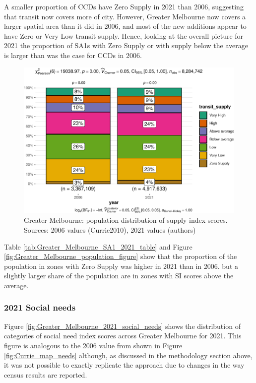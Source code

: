 \documentclass[preprint, 3p,
authoryear]{elsarticle} %
\begin{document}
A smaller proportion of CCDs have Zero Supply in 2021 than 2006,
suggesting that transit now covers more of city. However, Greater
Melbourne now covers a larger spatial area than it did in 2006, and most
of the new additions appear to have Zero or Very Low transit supply.
Hence, looking at the overall picture for 2021 the proportion of SA1s
with Zero Supply or with supply below the average is larger than was the
case for CCDs in 2006.

\begin{figure}
\centering
\includegraphics{Leveraging_GTFS_to_assess_transit_supply_Transport_Geography_files/figure-latex/Greater_Melbourne_population_figure-1.pdf}
\caption{Greater Melbourne: population distribution of supply index
scores. Sources: 2006 values (Currie2010), 2021 values (authors)}
\end{figure}

Table \ref{tab:Greater_Melbourne_SA1_2021_table} and Figure
\ref{fig:Greater_Melbourne_population_figure} show that the proportion
of the population in zones with Zero Supply was higher in 2021 than in
2006. but a slightly larger share of the population are in zones with SI
scores above the average.

\subsubsection{2021 Social needs}\label{social-needs}

Figure \ref{fig:Greater_Melbourne_2021_social_needs} shows the
distribution of categories of social need index scores across Greater
Melbourne for 2021. This figure is analogous to the 2006 value from
\citet{currie2010identifying} shown in Figure \ref{fig:Currie_map_needs}
although, as discussed in the methodology section above, it was not
possible to exactly replicate the \citet{currie2010identifying} approach
due to changes in the way census results are reported.
\end{document}
